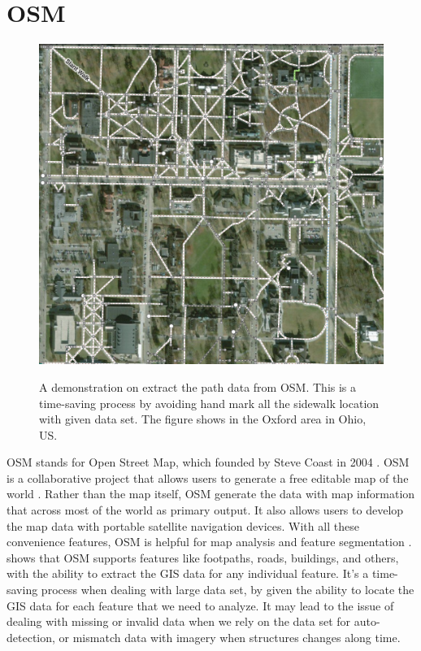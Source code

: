 \section{\ac{OSM}}
\begin{figure}[H]
    \centering
    \includegraphics[width=\textwidth]{Figures/oxford_path_data_osm.png}
    \caption[\ac{OSM} Walking Path]{A demonstration on extract the path data from \ac{OSM}. This is a time-saving process by avoiding hand mark all the sidewalk location with given data set. The figure shows in the Oxford area in Ohio, US.}
    \cite{OpenStreetMap}
    \label{fig:osm_oxford_path}
\end{figure}
\ac{OSM} stands for Open Street Map, which founded by Steve Coast in 2004 \cite{lasPiñas, OpenStreetMap}. \ac{OSM} is a collaborative project that allows users to generate a free editable map of the world \cite{4653466}. Rather than the map itself, \ac{OSM} generate the data with map information that across most of the world as primary output. It also allows users to develop the map data with portable satellite navigation devices. With all these convenience features, \ac{OSM} is helpful for map analysis and feature segmentation \cite{10.1007/11744078_9}.  shows that \ac{OSM} supports features like footpaths, roads, buildings, and others, with the ability to extract the \ac{GIS} data for any individual feature. It's a time-saving process when dealing with large data set, by given the ability to locate the \ac{GIS} data for each feature that we need to analyze. It may lead to the issue of dealing with missing or invalid data when we rely on the data set for auto-detection, or mismatch data with imagery when structures changes along time.

